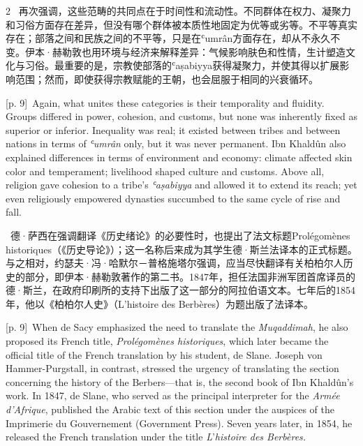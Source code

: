 \documentclass[10pt,a4paper]{article}
\begin{document}
\begin{paracol}{2}
\switchcolumn*
{\scriptsize\color{gray} [p. 9]}\ 再次强调，这些范畴的共同点在于时间性和流动性。不同群体在权力、凝聚力和习俗方面存在差异，但没有哪个群体被本质性地固定为优等或劣等。不平等真实存在；部落之间和民族之间的不平等，只是在ʿumrân方面存在，却从不永久不变。伊本·赫勒敦也用环境与经济来解释差异：气候影响肤色和性情，生计塑造文化与习俗。最重要的是，宗教使部落的ʿaṣabiyya获得凝聚力，并使其得以扩展影响范围；然而，即使获得宗教赋能的王朝，也会屈服于相同的兴衰循环。\par
\switchcolumn
{\scriptsize\color{gray} [p. 9]}\ Again, what unites these categories is their temporality and fluidity. Groups differed in power, cohesion, and customs, but none was inherently fixed as superior or inferior. Inequality was real; it existed between tribes and between nations in terms of \textit{ʿumrân} only, but it was never permanent. Ibn Khaldûn also explained differences in terms of environment and economy: climate affected skin color and temperament; livelihood shaped culture and customs. Above all, religion gave cohesion to a tribe’s \textit{ʿaṣabiyya} and allowed it to extend its reach; yet even religiously empowered dynasties succumbed to the same cycle of rise and fall.\par
\switchcolumn*
{\scriptsize\color{gray} [p. 9]}\ 德·萨西在强调翻译《历史绪论》的必要性时，也提出了法文标题Prolégomènes historiques（《历史导论》）；这一名称后来成为其学生德·斯兰法译本的正式标题。与之相对，约瑟夫·冯·哈默尔－普格施塔尔强调，应当尽快翻译有关柏柏尔人历史的部分，即伊本·赫勒敦著作的第二书。1847年，担任法国非洲军团首席译员的德·斯兰，在政府印刷所的支持下出版了这一部分的阿拉伯语文本。七年后的1854年，他以《柏柏尔人史》（L’histoire des Berbères）为题出版了法译本。\par
\switchcolumn
{\scriptsize\color{gray} [p. 9]}\ When de Sacy emphasized the need to translate the \textit{Muqaddimah}, he also proposed its French title, \textit{Prolégomènes historiques}, which later became the official title of the French translation by his student, de Slane. Joseph von Hammer-Purgstall, in contrast, stressed the urgency of translating the section concerning the history of the Berbers—that is, the second book of Ibn Khaldûn’s work. In 1847, de Slane, who served as the principal interpreter for the \textit{Armée d’Afrique}, published the Arabic text of this section under the auspices of the Imprimerie du Gouvernement (Government Press). Seven years later, in 1854, he released the French translation under the title \textit{L}’\textit{histoire des Berbères.}\par

\end{paracol}
\end{document}
